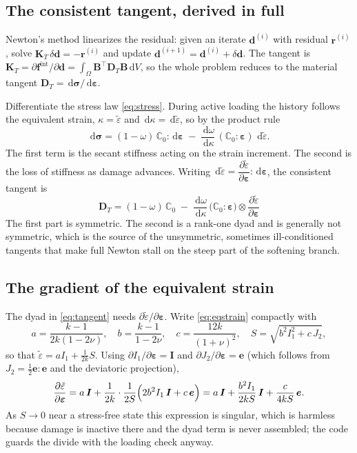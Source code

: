 \documentclass[11pt]{article}
\newcommand{\eps}{\bm{\varepsilon}}
\newcommand{\sig}{\bm{\sigma}}
\newcommand{\C}{\mathbb{C}}
\newcommand{\Id}{\bm{I}}
\newcommand{\eqs}{\tilde{\varepsilon}}
\newcommand{\dd}{\,\mathrm{d}}
\begin{document}
\subsection{The consistent tangent, derived in full}

Newton's method linearizes the residual: given an iterate $\bm d^{(i)}$ with residual
$\bm r^{(i)}$, solve $\bm K_T\,\delta\bm d = -\bm r^{(i)}$ and update
$\bm d^{(i+1)} = \bm d^{(i)} + \delta\bm d$. The tangent is
$\bm K_T = \partial \bm f^{\text{int}}/\partial\bm d = \int_\Omega \bm B^{\!\top}
\bm D_T \bm B \dd V$, so the whole problem reduces to the material tangent
$\bm D_T = \dd\sig/\dd\eps$.

Differentiate the stress law \eqref{eq:stress}. During active loading the history follows
the equivalent strain, $\kappa=\eqs$ and $\dd\kappa=\dd\eqs$, so by the product rule
%
\begin{equation}
\dd\sig
= (1-\omega)\,\C_0:\dd\eps
\;-\; \frac{\dd\omega}{\dd\kappa}\,(\C_0:\eps)\,\dd\eqs .
\end{equation}
%
The first term is the secant stiffness acting on the strain increment. The second is the
loss of stiffness as damage advances. Writing $\dd\eqs = \dfrac{\partial\eqs}{\partial\eps}:\dd\eps$,
the consistent tangent is
%
\begin{equation}
\boxed{\;
\bm D_T = (1-\omega)\,\C_0
\;-\; \frac{\dd\omega}{\dd\kappa}\,
\bigl(\C_0:\eps\bigr)\otimes\frac{\partial\eqs}{\partial\eps}
\;}
\label{eq:tangent}
\end{equation}
%
The first part is symmetric. The second is a rank-one dyad and is generally not symmetric,
which is the source of the unsymmetric, sometimes ill-conditioned tangents that make full
Newton stall on the steep part of the softening branch.

\subsection{The gradient of the equivalent strain}

The dyad in \eqref{eq:tangent} needs $\partial\eqs/\partial\eps$. Write \eqref{eq:eqstrain}
compactly with
%
\begin{equation}
a = \frac{k-1}{2k(1-2\nu)}, \quad
b = \frac{k-1}{1-2\nu}, \quad
c = \frac{12k}{(1+\nu)^2}, \quad
S = \sqrt{b^2 I_1^2 + c\,J_2},
\end{equation}
%
so that $\eqs = a I_1 + \tfrac{1}{2k}S$. Using $\partial I_1/\partial\eps = \Id$ and
$\partial J_2/\partial\eps = \bm e$ (which follows from $J_2=\tfrac12\bm e:\bm e$ and the
deviatoric projection),
%
\begin{equation}
\frac{\partial\eqs}{\partial\eps}
= a\,\Id
+ \frac{1}{2k}\cdot\frac{1}{2S}\Bigl(2b^2 I_1\,\Id + c\,\bm e\Bigr)
= a\,\Id + \frac{b^2 I_1}{2kS}\,\Id + \frac{c}{4kS}\,\bm e .
\label{eq:deqs}
\end{equation}
%
As $S\to 0$ near a stress-free state this expression is singular, which is harmless because
damage is inactive there and the dyad term is never assembled; the code guards the divide
with the loading check anyway.
\end{document}
